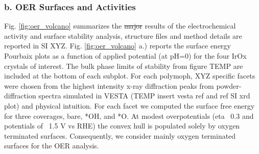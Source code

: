 

\subsubsection{b. OER Surfaces and Activities}

Fig. \ref{fig:oer_volcano} summarizes the \sout{major} results of the electrochemical activity and surface stability analysis, structure files and method details are reported in SI XYZ.
%
Fig. \ref{fig:oer_volcano} a.) reports the surface energy Pourbaix plots as a function of applied potential (at pH=0) for the four IrOx crystals of interest.
%
The bulk phase limits of stability from figure TEMP are included at the bottom of each subplot.
%
For each polymoph, XYZ specific facets were chosen from the highest intensity x-ray diffraction peaks from powder-diffraction spectra simulated in VESTA (TEMP insert vesta ref and ref SI xrd plot) and physical intuition.
%
For each facet we computed the surface free energy for three coverages, bare, *OH, and *O.
%
At modest overpotentials (eta ~0.3 and potentials of ~1.5 V vs RHE) the convex hull is populated solely by oxygen terminated surfaces.
%
Consequently, we consider mainly oxygen terminated surfaces for the OER analysis.
%

